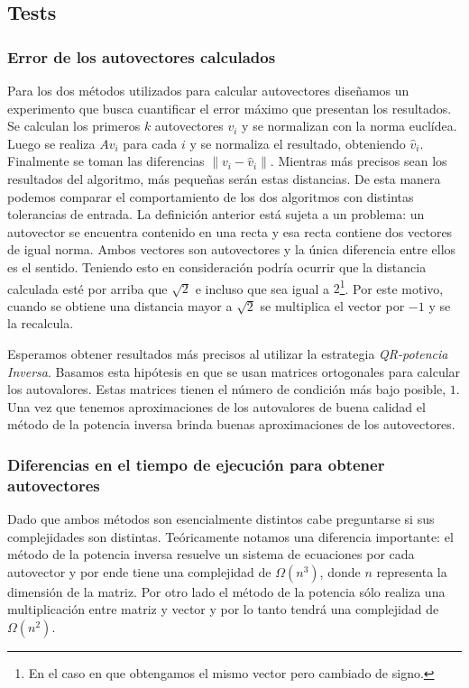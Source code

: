 \subsection{Tests}

	\subsubsection{Error de los autovectores calculados}
		Para los dos m\'etodos utilizados para calcular autovectores
		dise\~namos un experimento que busca cuantificar el error m\'aximo
		que presentan los resultados.
		Se calculan los primeros $k$ autovectores $v_i$ y se normalizan con la
		norma eucl\'idea. Luego se realiza $Av_i$ para cada $i$ y se normaliza
		el resultado, obteniendo $\hat{v}_i$. Finalmente se toman las diferencias
		$\|v_i-\hat{v}_i\|$. Mientras m\'as precisos sean los resultados del
		algoritmo, m\'as peque\~nas ser\'an estas distancias.
		De esta manera podemos comparar el comportamiento de los dos algoritmos
		con distintas tolerancias de entrada.
		La definici\'on anterior est\'a sujeta a un problema:
		un autovector se encuentra contenido en una recta y esa recta contiene
		dos vectores de igual norma. Ambos vectores son autovectores y la \'unica
		diferencia entre ellos es el sentido. Teniendo esto en consideraci\'on
		podr\'ia ocurrir que la distancia calculada est\'e por arriba que $\sqrt{2}$
		e incluso que sea igual a $2$\footnote{En el caso en que obtengamos el mismo
		vector pero cambiado de signo.}. Por este motivo, cuando se obtiene una
		distancia mayor a $\sqrt{2}$ se multiplica el vector por $-1$ y se la
		recalcula.
		
		Esperamos obtener resultados m\'as precisos al utilizar la estrategia
		\textit{QR-potencia Inversa}. Basamos esta hip\'otesis en que se usan
		matrices ortogonales para calcular los autovalores. Estas matrices
		tienen el n\'umero de condici\'on m\'as bajo posible, $1$.
		Una vez que tenemos aproximaciones de los autovalores de buena calidad
		el m\'etodo de la potencia inversa brinda buenas aproximaciones de los
		autovectores.

	\subsubsection{Diferencias en el tiempo de ejecuci\'on para obtener autovectores}
		Dado que ambos m\'etodos son esencialmente distintos cabe preguntarse
		si sus complejidades son distintas. Te\'oricamente notamos una diferencia
		importante: el m\'etodo de la potencia inversa resuelve un sistema de
		ecuaciones por cada autovector y por ende tiene una complejidad de $\Omega(n^3)$,
		donde $n$ representa la dimensi\'on de la matriz. Por otro lado el m\'etodo
		de la potencia s\'olo realiza una multiplicaci\'on entre matriz y vector
		y por lo tanto tendr\'a una complejidad de $\Omega(n^2)$.

